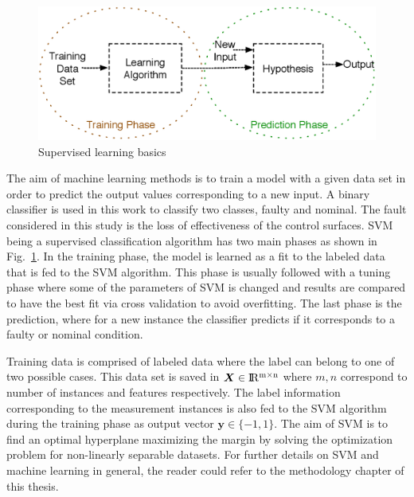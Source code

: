 \begin{figure}
\begin{center}
\includegraphics[width=12cm]{figures/supervisedLearningBasics}    %
\caption{Supervised learning basics } 
\label{fig:supervisedLearning}
\end{center}
\end{figure}

The aim of machine learning methods is to train a model with a given data set in order to predict the output values corresponding to a new input.
A binary classifier is used in this work to classify two classes, faulty and nominal. 
The fault considered in this study is the loss of effectiveness of the control surfaces. 
SVM being a supervised classification algorithm has two main phases as shown in Fig.~\ref{fig:supervisedLearning}. 
In the training phase, the model is learned as a fit to the labeled data that is fed to the SVM algorithm. 
This phase is usually followed with a tuning phase where some of the parameters of SVM is changed and results are compared to have the best fit via cross validation to avoid overfitting. 
The last phase is the prediction, where for a new instance the classifier predicts if it corresponds to a faulty or nominal condition.

Training data is comprised of labeled data where the label can belong to one of two possible cases. 
This data set is saved in $\bm{X} \in {\rm I\!R^{m \times n}}  $ where $m,n$ correspond to number of instances and features respectively. 
The label information corresponding to the measurement instances is also fed to the SVM algorithm during the training phase as output vector $\bm{y} \in \{-1,1\}$. 
The aim of SVM is to find an optimal hyperplane maximizing the margin by solving the optimization problem for non-linearly separable datasets. For further details on SVM and machine learning in general, the reader could refer to the methodology chapter of this thesis.

